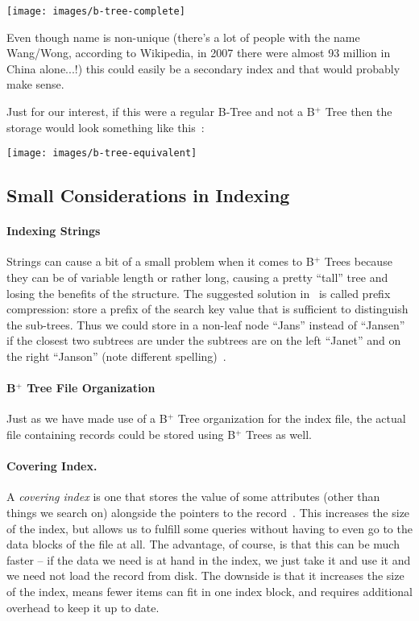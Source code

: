 \begin{center}
	\texttt{[image: images/b-tree-complete]}
\end{center}

Even though name is non-unique (there's a lot of people with the name Wang/Wong, according to Wikipedia, in 2007 there were almost 93 million in China alone...!) this could easily be a secondary index and that would probably make sense.

Just for our interest, if this were a regular B-Tree and not a B$^{+}$ Tree then the storage would look something like this~\cite{dsc}:

\begin{center}
	\texttt{[image: images/b-tree-equivalent]}
\end{center}

\subsection*{Small Considerations in Indexing}

\paragraph{Indexing Strings}
Strings can cause a bit of a small problem when it comes to B$^{+}$ Trees because they can be of variable length or rather long, causing a pretty ``tall'' tree and losing the benefits of the structure. The suggested solution in~\cite{dsc} is called prefix compression: store a prefix of the search key value that is sufficient to distinguish the sub-trees. Thus we could store in a non-leaf node ``Jans'' instead of ``Jansen'' if the closest two subtrees are under the subtrees are on the left ``Janet'' and on the right ``Janson'' (note different spelling)~\cite{dsc}.

\paragraph{B$^{+}$ Tree File Organization} 
Just as we have made use of a B$^{+}$ Tree organization for the index file, the actual file containing records could be stored using B$^{+}$ Trees as well.

\paragraph{Covering Index.} 
A \textit{covering index} is one that stores the value of some attributes (other than things we search on) alongside the pointers to the record~\cite{dsc}. This increases the size of the index, but allows us to fulfill some queries without having to even go to the data blocks of the file at all. The advantage, of course, is that this can be much faster -- if the data we need is at hand in the index, we just take it and use it and we need not load the record from disk. The downside is that it increases the size of the index, means fewer items can fit in one index block, and requires additional overhead to keep it up to date.

